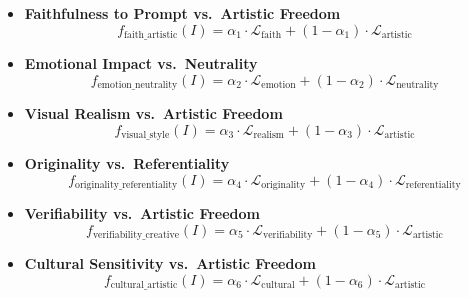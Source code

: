\begin{tcolorbox}[colframe=black,colback=white,boxrule=0.5mm,width=\columnwidth,sharp corners]
\scriptsize
\begin{itemize}[left=-4pt,itemsep=0pt,topsep=0pt,parsep=0pt]
    \item \textbf{Faithfulness to Prompt vs.\ Artistic Freedom}
    \vspace{-3mm}
    \[
    f_{\text{faith\_artistic}}(I) 
    = \alpha_1 \cdot \mathcal{L}_{\text{faith}}
    + (1 - \alpha_1) \cdot \mathcal{L}_{\text{artistic}}
    \]
    \vspace{-6mm}

    \item \textbf{Emotional Impact vs.\ Neutrality}
    \vspace{-3mm}
    \[
    f_{\text{emotion\_neutrality}}(I) 
    = \alpha_2 \cdot \mathcal{L}_{\text{emotion}}
    + (1 - \alpha_2) \cdot \mathcal{L}_{\text{neutrality}}
    \]
    \vspace{-6mm}

    \item \textbf{Visual Realism vs.\ Artistic Freedom}
    \vspace{-3mm}
    \[
    f_{\text{visual\_style}}(I) 
    = \alpha_3 \cdot \mathcal{L}_{\text{realism}}
    + (1 - \alpha_3) \cdot \mathcal{L}_{\text{artistic}}
    \]
    \vspace{-6mm}

    \item \textbf{Originality vs.\ Referentiality}
    \vspace{-3mm}
    \[
    f_{\text{originality\_referentiality}}(I) 
    = \alpha_4 \cdot \mathcal{L}_{\text{originality}}
    + (1 - \alpha_4) \cdot \mathcal{L}_{\text{referentiality}}
    \]
    \vspace{-6mm}

    \item \textbf{Verifiability vs.\ Artistic Freedom}
    \vspace{-3mm}
    \[
    f_{\text{verifiability\_creative}}(I) 
    = \alpha_5 \cdot \mathcal{L}_{\text{verifiability}}
    + (1 - \alpha_5) \cdot \mathcal{L}_{\text{artistic}}
    \]
    \vspace{-6mm}

    \item \textbf{Cultural Sensitivity vs.\ Artistic Freedom}
    \vspace{-3mm}
    \[
    f_{\text{cultural\_artistic}}(I) 
    = \alpha_6 \cdot \mathcal{L}_{\text{cultural}}
    + (1 - \alpha_6) \cdot \mathcal{L}_{\text{artistic}}
    \]
\end{itemize}
\end{tcolorbox}


